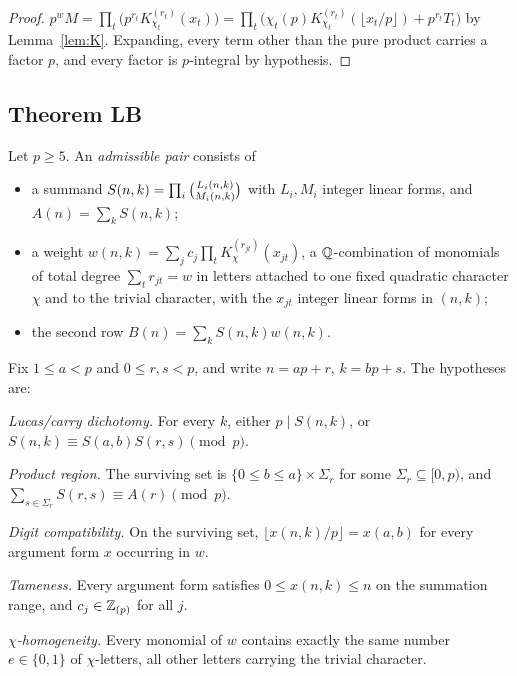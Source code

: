 \begin{proof}
$p^wM=\prod_t\bigl(p^{r_t}K^{(r_t)}_{\chi_t}(x_t)\bigr)
=\prod_t\bigl(\chi_t(p)K^{(r_t)}_{\chi_t}(\lfloor x_t/p\rfloor)+p^{r_t}T_t\bigr)$
by Lemma~\ref{lem:K}. Expanding, every term other than the pure product carries a factor
$p$, and every factor is $p$-integral by hypothesis.
\end{proof}

\subsection{Theorem LB}

\begin{definition}\label{def:admissible}
Let $p\ge5$. An \emph{admissible pair} consists of
\begin{itemize}[leftmargin=1.4em]
\item a summand $S(n,k)=\prod_i\binom{L_i(n,k)}{M_i(n,k)}$ with $L_i,M_i$ integer linear
  forms, and $A(n)=\sum_kS(n,k)$;
\item a weight $w(n,k)=\sum_jc_j\prod_tK^{(r_{jt})}_{\chi}(x_{jt})$, a $\mathbb{Q}$-combination of
  monomials of total degree $\sum_tr_{jt}=w$ in letters attached to one fixed quadratic
  character $\chi$ and to the trivial character, with the $x_{jt}$ integer linear forms in
  $(n,k)$;
\item the second row $B(n)=\sum_kS(n,k)w(n,k)$.
\end{itemize}
\end{definition}

Fix $1\le a<p$ and $0\le r,s<p$, and write $n=ap+r$, $k=bp+s$. The hypotheses are:

\begin{description}[leftmargin=3.0em,style=sameline]
\item[(H1)] \emph{Lucas/carry dichotomy.} For every $k$, either $p\mid S(n,k)$, or
  $S(n,k)\equiv S(a,b)S(r,s)\pmod p$.
\item[(H2)] \emph{Product region.} The surviving set is $\{0\le b\le a\}\times\Sigma_r$
  for some $\Sigma_r\subseteq[0,p)$, and $\sum_{s\in\Sigma_r}S(r,s)\equiv A(r)\pmod p$.
\item[(H3)] \emph{Digit compatibility.} On the surviving set,
  $\lfloor x(n,k)/p\rfloor=x(a,b)$ for every argument form $x$ occurring in $w$.
\item[(H4)] \emph{Tameness.} Every argument form satisfies $0\le x(n,k)\le n$ on the
  summation range, and $c_j\in\mathbb{Z}_{(p)}$ for all $j$.
\item[(H5)] \emph{$\chi$-homogeneity.} Every monomial of $w$ contains exactly the same
  number $e\in\{0,1\}$ of $\chi$-letters, all other letters carrying the trivial
  character.
\end{description}

